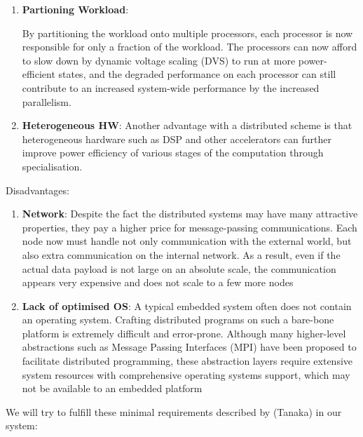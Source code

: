 \begin{enumerate}

\item \textbf{Partioning Workload}:

By partitioning the workload onto multiple processors, each processor is now
responsible for only a fraction of the workload. The processors can now afford
to slow down by dynamic voltage scaling (DVS) to run at more power-efficient
states, and the degraded performance on each processor can still contribute to
an increased system-wide performance by the increased parallelism.

\item \textbf{Heterogeneous HW}:
Another advantage with a distributed scheme is that heterogeneous hardware such
as DSP and other accelerators can further improve power efficiency of various
stages of the computation through specialisation.

\end{enumerate}


Disadvantages:

\begin{enumerate}
\item \textbf{Network}: Despite the fact the distributed systems may have
many attractive properties, they pay a higher price for message-passing
communications. Each node now must handle not only communication
with the external world, but also extra communication on the internal network.
As a result, even if the actual data payload is not large
on an absolute scale, the communication appears very expensive and
does not scale to a few more nodes

\item \textbf{Lack of optimised OS}: A typical embedded system often does
not contain an operating system. Crafting distributed programs on such a
bare-bone platform is extremely difficult and error-prone. Although many
higher-level abstractions such as Message Passing Interfaces (MPI)
have been proposed to facilitate distributed programming, these abstraction
layers require extensive system resources with comprehensive operating systems
support, which may not be available to an embedded platform
\end{enumerate}

We will try to fulfill these minimal requirements described by (Tanaka) in our
system:

